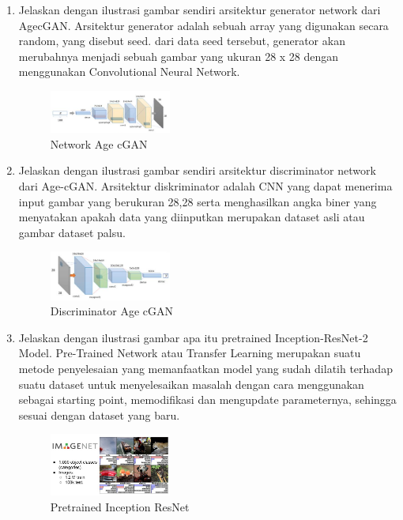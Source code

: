 \begin{enumerate}
        \item Jelaskan dengan ilustrasi gambar sendiri arsitektur generator network dari AgecGAN.
		Arsitektur generator adalah sebuah array yang digunakan secara random, yang disebut seed. dari data seed tersebut, generator akan merubahnya menjadi sebuah gambar yang ukuran 28 x 28 dengan menggunakan Convolutional Neural Network.
		\begin{figure}[H]
			\includegraphics[width=4cm]{figures/1174039/chapter9/teori4.PNG}
            	\centering
           	\caption{Network Age cGAN}
       	\end{figure}


        \item Jelaskan dengan ilustrasi gambar sendiri arsitektur discriminator network dari Age-cGAN.
		Arsitektur diskriminator adalah CNN yang dapat menerima input gambar yang berukuran 28,28 serta menghasilkan angka biner yang menyatakan apakah data yang diinputkan merupakan dataset asli atau gambar dataset palsu.
		\begin{figure}[H]
			\includegraphics[width=4cm]{figures/1174039/chapter9/teori5.PNG}
            	\centering
           	\caption{Discriminator Age cGAN}
       	\end{figure}


        \item Jelaskan dengan ilustrasi gambar apa itu pretrained Inception-ResNet-2 Model.
		Pre-Trained Network atau Transfer Learning merupakan suatu metode penyelesaian yang memanfaatkan model yang sudah dilatih terhadap suatu dataset untuk menyelesaikan masalah dengan cara menggunakan sebagai starting point, memodifikasi dan mengupdate parameternya, sehingga sesuai dengan dataset yang baru.
		\begin{figure}[H]
			\includegraphics[width=4cm]{figures/1174039/chapter9/teori6.PNG}
            	\centering
           	\caption{Pretrained Inception ResNet}
       	\end{figure}


\end{enumerate}
